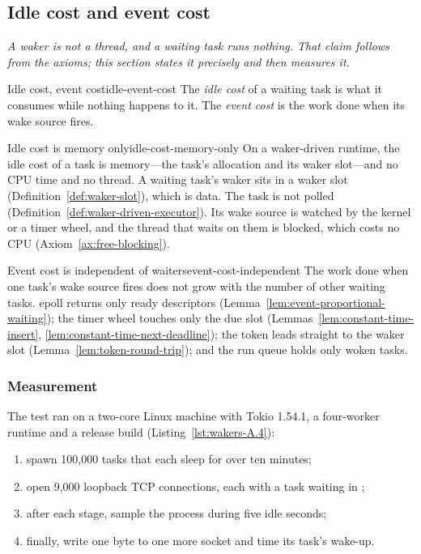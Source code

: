 \subsection{Idle cost and event cost}
\label{sec:wakers-ch16}

\textit{A waker is not a thread, and a waiting task runs nothing. That claim follows from the axioms; this section states it precisely and then measures it.}

\begin{definition}{Idle cost, event cost}{idle-event-cost}
    The \emph{idle cost} of a waiting task is what it consumes while nothing happens to it. The \emph{event cost} is the work done when its wake source fires.
\end{definition}

\begin{lemma}{Idle cost is memory only}{idle-cost-memory-only}
    On a waker-driven runtime, the idle cost of a task is memory---the task's allocation and its waker slot---and no CPU time and no thread.
    \why A waiting task's waker sits in a waker slot (Definition~\ref{def:waker-slot}), which is data. The task is not polled (Definition~\ref{def:waker-driven-executor}). Its wake source is watched by the kernel or a timer wheel, and the thread that waits on them is blocked, which costs no CPU (Axiom~\ref{ax:free-blocking}).
\end{lemma}

\begin{lemma}{Event cost is independent of waiters}{event-cost-independent}
    The work done when one task's wake source fires does not grow with the number of other waiting tasks.
    \why epoll returns only ready descriptors (Lemma~\ref{lem:event-proportional-waiting}); the timer wheel touches only the due slot (Lemmas~\ref{lem:constant-time-insert}, \ref{lem:constant-time-next-deadline}); the token leads straight to the waker slot (Lemma~\ref{lem:token-round-trip}); and the run queue holds only woken tasks.
\end{lemma}

\subsubsection{Measurement}

The test ran on a two-core Linux machine with Tokio 1.54.1, a four-worker runtime and a release build (Listing~\ref{lst:wakers-A.4}):

\begin{enumerate}
    \item spawn 100,000 tasks that each sleep for over ten minutes;
    \item open 9,000 loopback TCP connections, each with a task waiting in ;
    \item after each stage, sample the process during five idle seconds;
    \item finally, write one byte to one more socket and time its task's wake-up.
\end{enumerate}

